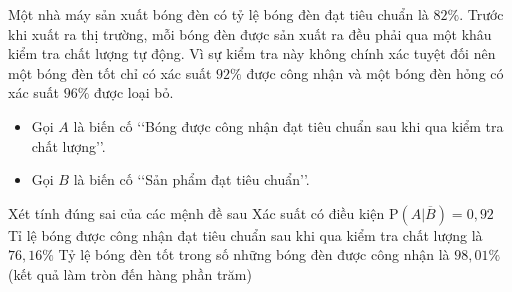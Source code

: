 \begin{ex}%
	Một nhà máy sản xuất bóng đèn có tỷ lệ bóng đèn đạt tiêu chuẩn là $82\%$. Trước khi xuất ra thị trường, mỗi bóng đèn được sản xuất ra đều phải qua một khâu kiểm tra chất lượng tự động. Vì sự kiểm tra này không chính xác tuyệt đối nên một bóng đèn tốt chỉ có xác suất $92\%$ được công nhận và một bóng đèn hỏng có xác suất $96\%$ được loại bỏ.
	\begin{itemize}
		\item Gọi $A$ là biến cố \lq\lq Bóng được công nhận đạt tiêu chuẩn sau khi qua kiểm tra chất lượng\rq\rq.
		\item Gọi $B$ là biến cố \lq\lq Sản phẩm đạt tiêu chuẩn\rq\rq.
	\end{itemize}
	Xét tính đúng sai của các mệnh đề sau
	{Xác suất có điều kiện $\mathrm{P}(A|\overline{B})=0{,}92$}
	{\True Tỉ lệ bóng được công nhận đạt tiêu chuẩn sau khi qua kiểm tra chất lượng là $76{,}16\%$}
	{Tỷ lệ bóng đèn tốt trong số những bóng đèn được công nhận là $98{,}01\%$ (kết quả làm tròn đến hàng phần trăm)}
\end{ex}

